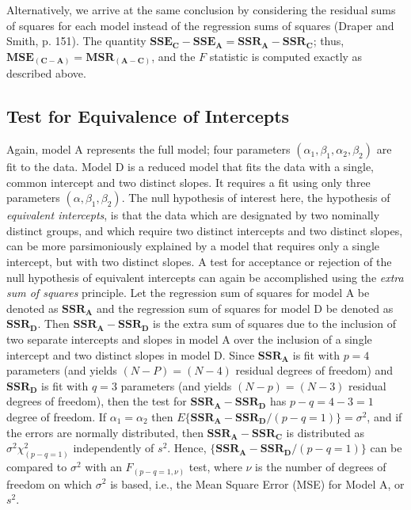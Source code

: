 \documentclass[11pt, oneside]{article}   	%
\begin{document}
Alternatively, we arrive at the same conclusion by considering the residual sums of squares for each model instead of the regression sums of squares (Draper and Smith, p. 151).  The quantity $ \mathbf{ SSE_{C}} - \mathbf{SSE_{A} }  =   \mathbf{SSR_{A}} -  \mathbf{SSR_{C}}  $; thus, $ \mathbf{ MSE_{(C-A)}}   =  \mathbf{MSR_{(A-C)}} $, and the $  F  $ statistic is computed exactly as described above.
\bigskip
   
\subsection{Test for Equivalence of Intercepts}
Again, model A represents the full model; four parameters $  (\alpha_{1}, \beta_{1}, \alpha_{2}, \beta_{2}) $ are fit to the data.  Model D is a reduced model that fits the data with a single, common intercept and two distinct slopes.  It requires a fit using only three parameters $  (\alpha, \beta_{1}, \beta_{2}) $. The null hypothesis of interest here, the hypothesis of \emph{equivalent intercepts}, is that the data which are designated by two nominally distinct groups, and which require two distinct intercepts and two distinct slopes, can be more parsimoniously explained by a model that requires only a single intercept, but with two distinct slopes.  A test for acceptance or rejection of the null hypothesis of equivalent intercepts can again be accomplished using the \emph{extra sum of squares} principle. Let the regression sum of squares for model A be denoted as $ \mathbf{SSR_{A}} $ and the regression sum of squares for model D be denoted as $ \mathbf{SSR_{D}} $. Then $ \mathbf{SSR_{A}} -  \mathbf{SSR_{D}} $ is the extra sum of squares due to the inclusion of two separate intercepts and slopes in model A over the inclusion of a single intercept and two distinct slopes in model D. Since  $ \mathbf{SSR_{A}} $  is fit with $ p = 4 $ parameters (and yields $ (N - P) = (N - 4) $ residual degrees of freedom) and $  \mathbf{SSR_{D}} $ is fit with $ q = 3 $ parameters (and yields $ (N - p) = (N - 3) $ residual degrees of freedom), then the test for $ \mathbf{SSR_{A}} -  \mathbf{SSR_{D}} $ has $  p - q = 4 - 3 = 1  $ degree of freedom.  If $ \alpha_{1} = \alpha_ {2} $ then $ E\{  \mathbf{SSR_{A}} -  \mathbf{SSR_{D}}   / (p - q = 1) \} = \sigma^{2} $, and if the errors are normally distributed, then $ \mathbf{SSR_{A}} -  \mathbf{SSR_{C}} $ is distributed as  $ \sigma^{2} \chi^{2}_{(p-q=1)}  $ independently of $ s^{2}  $.  Hence, $ \{  \mathbf{SSR_{A}} -  \mathbf{SSR_{D}}   / (p - q = 1) \} $ can be compared to $ \sigma^{2} $ with an $ F_(p-q =1, \nu) $ test, where $ \nu $ is the number of degrees of freedom on which $ \sigma^{2} $ is based, i.e., the Mean Square Error (MSE) for Model A, or $  s^2 $.   
\end{document}
